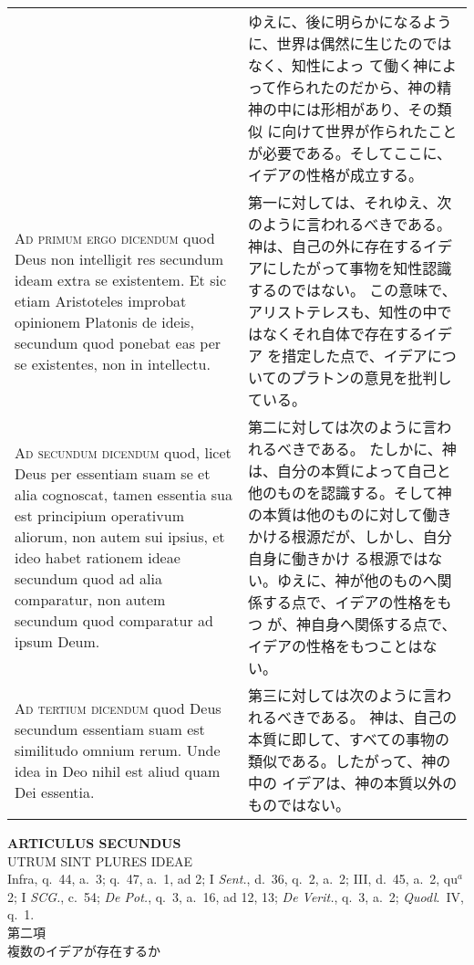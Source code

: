 \documentclass[10pt]{jsarticle} %
\begin{document}
\begin{longtable}{p{21em}p{21em}}
&

ゆえに、後に明らかになるように、世界は偶然に生じたのではなく、知性によっ
 て働く神によって作られたのだから、神の精神の中には形相があり、その類似
 に向けて世界が作られたことが必要である。そしてここに、イデアの性格が成立する。

\\


{\scshape Ad primum ergo dicendum} quod Deus non
intelligit res secundum ideam extra se existentem. Et sic etiam
Aristoteles improbat opinionem Platonis de ideis, secundum quod ponebat
eas per se existentes, non in intellectu.

&

第一に対しては、それゆえ、次のように言われるべきである。
神は、自己の外に存在するイデアにしたがって事物を知性認識するのではない。
 この意味で、アリストテレスも、知性の中ではなくそれ自体で存在するイデア
 を措定した点で、イデアについてのプラトンの意見を批判している。

\\


{\scshape Ad secundum dicendum} quod, licet Deus per
essentiam suam se et alia cognoscat, tamen essentia sua est principium
operativum aliorum, non autem sui ipsius, et ideo habet rationem ideae
secundum quod ad alia comparatur, non autem secundum quod comparatur ad
ipsum Deum.

&

第二に対しては次のように言われるべきである。
たしかに、神は、自分の本質によって自己と他のものを認識する。そして神
 の本質は他のものに対して働きかける根源だが、しかし、自分自身に働きかけ
 る根源ではない。ゆえに、神が他のものへ関係する点で、イデアの性格をもつ
 が、神自身へ関係する点で、イデアの性格をもつことはない。

\\


{\scshape Ad tertium dicendum} quod Deus secundum
essentiam suam est similitudo omnium rerum. Unde idea in Deo nihil est
aliud quam Dei essentia.

&
第三に対しては次のように言われるべきである。
神は、自己の本質に即して、すべての事物の類似である。したがって、神の中の
 イデアは、神の本質以外のものではない。




\end{longtable}
\newpage


\begin{center}
 {\Large {\bf ARTICULUS SECUNDUS}}\\
 {\large UTRUM SINT PLURES IDEAE}\\
 {\footnotesize Infra, q.~44, a.~3; q.~47, a.~1, ad 2; I {\itshape
 Sent.}, d.~36, q.~2, a.~2; III, d.~45, a.~2, qu$^a$ 2; I {\itshape
 SCG.}, c.~54; {\itshape De Pot.}, q.~3, a.~16, ad 12, 13; {\itshape De
 Verit.}, q.~3, a.~2; {\itshape Quodl}.~IV, q.~1.}\\
 {\Large 第二項\\複数のイデアが存在するか}
\end{center}
\end{document}
